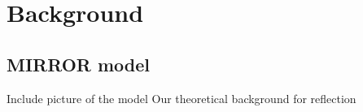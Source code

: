 \chapter{Background}

\section{MIRROR model}
Include picture of the model
Our theoretical background for reflection